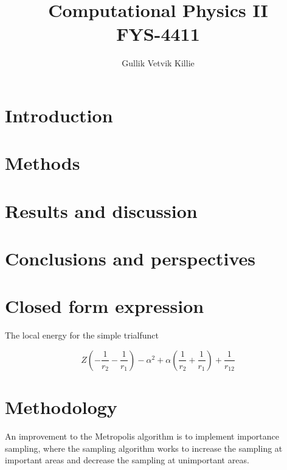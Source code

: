 \documentclass[11pt]{article}
\title{ Computational Physics II \\ FYS-4411 }
\author{Gullik Vetvik Killie}
\begin{document}

\section{Introduction}

\section{Methods}

\section{ Results and discussion }

\section{ Conclusions and perspectives }

\appendix

\section{Closed form expression}

	The local energy for the simple trialfunct

	\[
	Z \left(- \frac{1}{r_{2}} - \frac{1}{r_{1}}\right) - \alpha^{2} + \alpha \left(\frac{1}{r_{2}} + \frac{1}{r_{1}}\right) + \frac{1}{r_{12}}
	\]


\section{Methodology}
	An improvement to the Metropolis algorithm is to implement importance sampling, where the sampling algorithm works to increase the sampling at important areas and decrease the sampling at unimportant areas.
\end{document}
